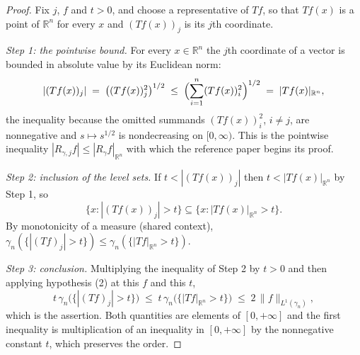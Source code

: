 \begin{proof}
Fix $j$, $f$ and $t > 0$, and choose a representative of $Tf$, so that $Tf(x)$ is
a point of $\mathbb{R}^n$ for every $x$ and $(Tf(x))_j$ is its $j$th coordinate.

\emph{Step 1: the pointwise bound.}
For every $x \in \mathbb{R}^n$ the $j$th coordinate of a vector is bounded in
absolute value by its Euclidean norm:
\[
  |(Tf(x))_j| \;=\; \bigl((Tf(x))_j^2\bigr)^{1/2}
    \;\leq\; \Bigl(\sum_{i=1}^n (Tf(x))_i^2\Bigr)^{1/2}
    \;=\; |Tf(x)|_{\mathbb{R}^n},
\]
the inequality because the omitted summands $(Tf(x))_i^2$, $i \neq j$, are
nonnegative and $s \mapsto s^{1/2}$ is nondecreasing on $[0,\infty)$.  This is the
pointwise inequality $|R_{\gamma,j}f| \leq |R_\gamma f|_{\mathbb{R}^n}$ with which
the reference paper begins its proof.

\emph{Step 2: inclusion of the level sets.}
If $t < |(Tf(x))_j|$ then $t < |Tf(x)|_{\mathbb{R}^n}$ by Step 1, so
\[
  \{x : |(Tf(x))_j| > t\} \subseteq \{x : |Tf(x)|_{\mathbb{R}^n} > t\} .
\]
By monotonicity of a measure (shared context),
$\gamma_n(\{|(Tf)_j| > t\}) \leq \gamma_n(\{|Tf|_{\mathbb{R}^n} > t\})$.

\emph{Step 3: conclusion.}
Multiplying the inequality of Step 2 by $t > 0$ and then applying hypothesis (2)
at this $f$ and this $t$,
\[
  t\,\gamma_n\bigl(\{|(Tf)_j| > t\}\bigr)
    \;\leq\; t\,\gamma_n\bigl(\{|Tf|_{\mathbb{R}^n} > t\}\bigr)
    \;\leq\; 2\,\|f\|_{L^1(\gamma_n)} ,
\]
which is the assertion.  Both quantities are elements of $[0,+\infty]$ and the
first inequality is multiplication of an inequality in $[0,+\infty]$ by the
nonnegative constant $t$, which preserves the order.
\end{proof}
